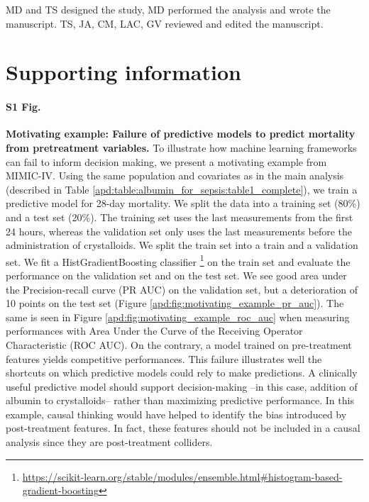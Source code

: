 \documentclass[10pt,letterpaper]{article}
\begin{document}
MD and TS designed the study, MD performed the analysis and wrote the manuscript.
TS, JA, CM, LAC, GV reviewed and edited the manuscript.


\clearpage

\section*{Supporting information}

\paragraph*{S1 Fig.}
\label{apd:motivating_example}
{\bf Motivating example: Failure of predictive models to predict mortality
  from pretreatment variables.}
To illustrate how machine learning frameworks can fail to inform decision
making, we present a motivating example from MIMIC-IV. Using the same
population and covariates as in the main analysis (described in Table
\ref{apd:table:albumin_for_sepsis:table1_complete}), we train a predictive
model for 28-day mortality. We split the data into a training set (80\%) and a
test set (20\%). The training set uses the last measurements from the first 24
hours, whereas the validation set only uses the last measurements before the
administration of crystalloids. We split the train set into a train and a
validation set. We fit a HistGradientBoosting classifier
\footnote{\url{https://scikit-learn.org/stable/modules/ensemble.html\#histogram-based-gradient-boosting}}
on the train set and evaluate the performance on the validation set and on the
test set. We see good area under the Precision-recall curve (PR AUC) on the
validation set, but a deterioration of 10 points on the test set (Figure
\ref{apd:fig:motivating_example_pr_auc}). The same is seen in Figure
\ref{apd:fig:motivating_example_roc_auc} when measuring performances with Area
Under the Curve of the Receiving Operator Characteristic (ROC AUC). On the
contrary, a model trained on pre-treatment features yields competitive
performances. This failure illustrates well the shortcuts on which predictive
models could rely to make predictions. A clinically useful predictive model
should support decision-making --in this case, addition of albumin to
crystalloids-- rather than maximizing predictive performance. In this example,
causal thinking would have helped to identify the bias introduced by
post-treatment features. In fact, these features should not be included in a
causal analysis since they are post-treatment colliders.
\end{document}

